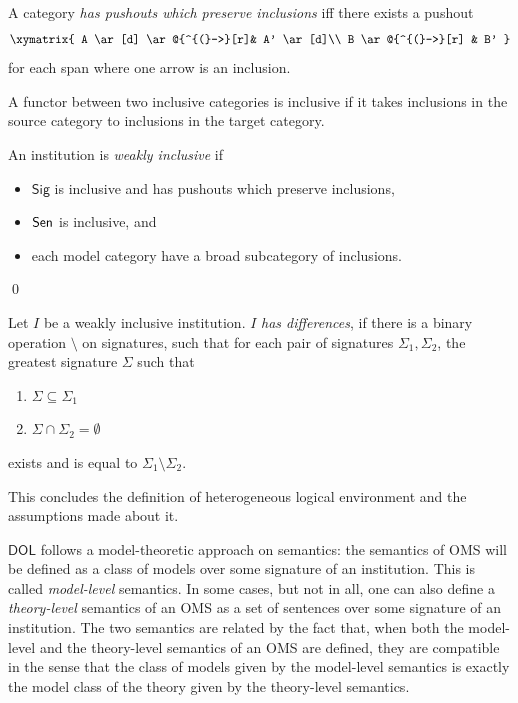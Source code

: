 \documentclass[10pt,fleqn,final]{scrreprt}
\newcommand{\Sig}{\mathsf{Sig}}
\newcommand*{\DOL}{\ensuremath{\mathsf{DOL}}\xspace}
\newenvironment{definitions}[0]{\medskip }{}
\begin{document}
\begin{definitions}
\noindent
A category \emph{has pushouts which preserve inclusions} iff 
there exists a pushout
$$
\xymatrix{
  A  \ar[d] \ar@{^{(}->}[r]& A' \ar[d]\\
  B \ar@{^{(}->}[r] & B'
}
$$ for each span where one arrow is an inclusion.

A functor between two inclusive categories is inclusive if it takes inclusions in the source category to inclusions in the target category.

\begin{definition}
 An institution is \emph{weakly inclusive} if
   \begin{itemize}
     \item $\Sig$ is inclusive and has pushouts which preserve inclusions,
     \item $\mathsf{Sen}$ is inclusive, and
     \item each model category have a broad subcategory of inclusions.
   \end{itemize}
\qed\end{definition}

Let $I$ be a weakly inclusive institution.  $I$  \emph{has differences}, if there is a binary operation $\setminus$ on signatures, 
such that for each pair of signatures 
$\Sigma_1, \Sigma_2$, the greatest signature $\Sigma$ such that
\begin{enumerate}
  \item $\Sigma \subseteq \Sigma_1$
  \item $\Sigma \cap \Sigma_2 = \emptyset$
\end{enumerate} 
exists and is equal to $\Sigma_1\setminus \Sigma_2$.
  


This concludes the definition of heterogeneous logical environment and the assumptions made about it.

\medskip



\DOL follows a model-theoretic approach on semantics: the semantics of OMS will be defined as a class of models 
over some signature of an institution. This is called \emph{model-level}  semantics. In some cases, but not in all, one can also define
a \emph{theory-level} semantics of an OMS as a set of sentences over some signature of an institution. The two semantics are 
related by the fact that, when both the model-level and the theory-level semantics of an OMS are defined, they are compatible in the 
sense that the class of models given by the model-level semantics is exactly the model class of the theory given by the
theory-level semantics. 


\end{definitions}
\end{document}
